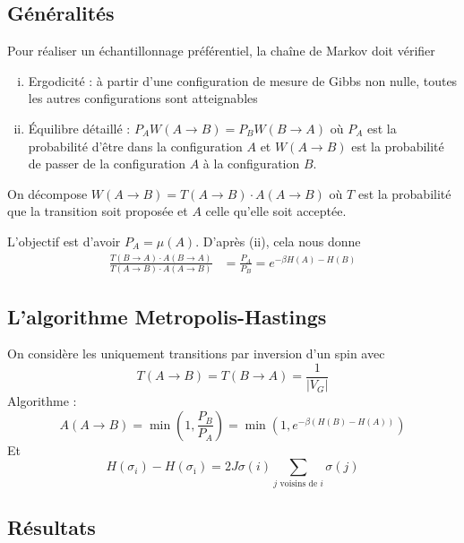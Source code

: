 \documentclass[french]{beamer}
\begin{document}
\subsection{Généralités}

\begin{frame}
Pour réaliser un échantillonnage préférentiel, la chaîne de Markov doit vérifier
\begin{enumerate}[(i)]
	\item Ergodicité : à partir d'une configuration de mesure de Gibbs non nulle, toutes les autres configurations sont atteignables
	\item \'Equilibre détaillé : $P_AW(A \to B) = P_BW(B \to A)$ où $P_A$ est la probabilité d'être dans la configuration $A$ et $W(A \to B)$ est la probabilité de passer de la configuration $A$ à la configuration $B$.
\end{enumerate}
On décompose $W(A \to B) = T(A \to B) \cdot A(A \to B)$ où $T$ est la probabilité que la transition soit proposée et $A$ celle qu'elle soit acceptée.

L'objectif est d'avoir $P_A = \mu(A)$. D'après (ii), cela nous donne 
\begin{align*}
\frac{T(B \to A)\cdot A(B \to A)}{T(A\to B)\cdot A(A \to B)} &= \frac{P_A}{P_B} = e^{-\beta{H(A) - H(B)}}
\end{align*}
\end{frame}

%
\subsection{L'algorithme Metropolis-Hastings}
%

\begin{frame}
	On considère les uniquement transitions par inversion d'un spin avec \[T(A \to B) = T(B \to A) = \frac{1}{\left|V_G\right|}\]
	Algorithme  :
	\[
	A(A \to B) = \min\left(1, \frac{P_B}{P_A}\right) = \min\left(1, e^{-\beta(H(B) - H(A))}\right)
	\]
	Et
	\[
	H(\sigma_i) - H(\sigma_{\overline{\imath}}) = 2J\sigma(i) \sum_\text{$j$ voisins de $i$} \sigma(j)
	\]
\end{frame}

%
\subsection{Résultats}
%
\end{document}
